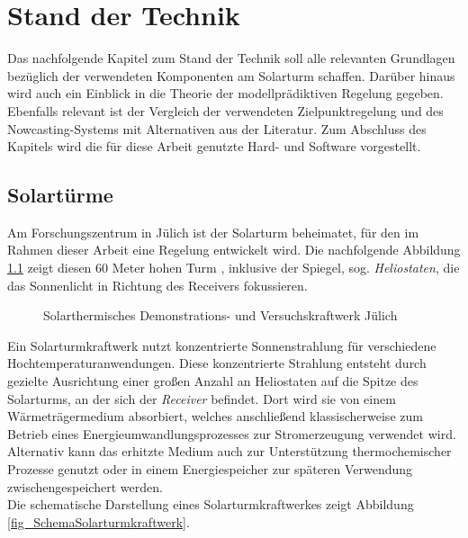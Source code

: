 \chapter{Stand der Technik} \label{ch_StandTechnik}
Das nachfolgende Kapitel zum Stand der Technik soll alle relevanten Grundlagen bezüglich der verwendeten Komponenten am Solarturm schaffen.
Darüber hinaus wird auch ein Einblick in die Theorie der modellprädiktiven Regelung gegeben.
Ebenfalls relevant ist der Vergleich der verwendeten Zielpunktregelung und des Nowcasting-Systems mit Alternativen aus der Literatur.
Zum Abschluss des Kapitels wird die für diese Arbeit genutzte Hard- und Software vorgestellt.

\section{Solartürme} \label{sec_Solartürme}
Am Forschungszentrum in Jülich ist der Solarturm beheimatet, für den im Rahmen dieser Arbeit eine Regelung entwickelt wird.
Die nachfolgende Abbildung \ref{fig_Solarturm} zeigt diesen 60 Meter hohen Turm \cite{DLRSolartürmeBild}, inklusive der Spiegel, sog. \textit{Heliostaten}, die das Sonnenlicht in Richtung des Receivers fokussieren.

\begin{figure}[h!]
    \centering
    \setlength{\fboxsep}{1pt}
    \setlength{\fboxrule}{1pt}
\caption[Solarthermisches Demonstrations- und Versuchskraftwerk Jülich]{Solarthermisches Demonstrations- und Versuchskraftwerk Jülich \cite{DLRSolartürmeBild}}
    \label{fig_Solarturm}
\end{figure}

Ein Solarturmkraftwerk nutzt konzentrierte Sonnenstrahlung für verschiedene Hochtemperaturanwendungen.
Diese konzentrierte Strahlung entsteht durch gezielte Ausrichtung einer großen Anzahl an Heliostaten auf die Spitze des Solarturms, an der sich der \textit{Receiver} befindet.
Dort wird sie von einem Wärmeträgermedium absorbiert, welches anschließend klassischerweise zum Betrieb eines Energieumwandlungsprozesses zur Stromerzeugung verwendet wird.
Alternativ kann das erhitzte Medium auch zur Unterstützung thermochemischer Prozesse genutzt oder in einem Energiespeicher zur späteren Verwendung zwischengespeichert werden. \cite[S.11]{DissBelhomme}\\
Die schematische Darstellung eines Solarturmkraftwerkes zeigt Abbildung \ref{fig_SchemaSolarturmkraftwerk}.

